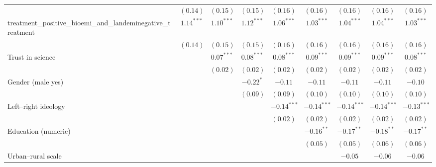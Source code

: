 \begin{table}[h]
\begin{center}
\begin{tabular}{l c c c c c c c c}
                                                             & $(0.14)$      & $(0.15)$      & $(0.15)$      & $(0.16)$      & $(0.16)$      & $(0.16)$      & $(0.16)$      & $(0.16)$      \\
treatment\_positive\_bioemi\_and\_landeminegative\_treatment & $1.14^{***}$  & $1.10^{***}$  & $1.12^{***}$  & $1.06^{***}$  & $1.03^{***}$  & $1.04^{***}$  & $1.04^{***}$  & $1.03^{***}$  \\
                                                             & $(0.14)$      & $(0.15)$      & $(0.15)$      & $(0.16)$      & $(0.16)$      & $(0.16)$      & $(0.16)$      & $(0.16)$      \\
Trust in science                                             &               & $0.07^{***}$  & $0.08^{***}$  & $0.08^{***}$  & $0.09^{***}$  & $0.09^{***}$  & $0.09^{***}$  & $0.08^{***}$  \\
                                                             &               & $(0.02)$      & $(0.02)$      & $(0.02)$      & $(0.02)$      & $(0.02)$      & $(0.02)$      & $(0.02)$      \\
Gender (male yes)                                            &               &               & $-0.22^{*}$   & $-0.11$       & $-0.11$       & $-0.11$       & $-0.11$       & $-0.10$       \\
                                                             &               &               & $(0.09)$      & $(0.09)$      & $(0.10)$      & $(0.10)$      & $(0.10)$      & $(0.10)$      \\
Left–right ideology                                          &               &               &               & $-0.14^{***}$ & $-0.14^{***}$ & $-0.14^{***}$ & $-0.14^{***}$ & $-0.13^{***}$ \\
                                                             &               &               &               & $(0.02)$      & $(0.02)$      & $(0.02)$      & $(0.02)$      & $(0.02)$      \\
Education (numeric)                                          &               &               &               &               & $-0.16^{**}$  & $-0.17^{**}$  & $-0.18^{**}$  & $-0.17^{**}$  \\
                                                             &               &               &               &               & $(0.05)$      & $(0.05)$      & $(0.06)$      & $(0.06)$      \\
Urban–rural scale                                            &               &               &               &               &               & $-0.05$       & $-0.06$       & $-0.06$       \\

\end{tabular}
\end{center}
\end{table}
